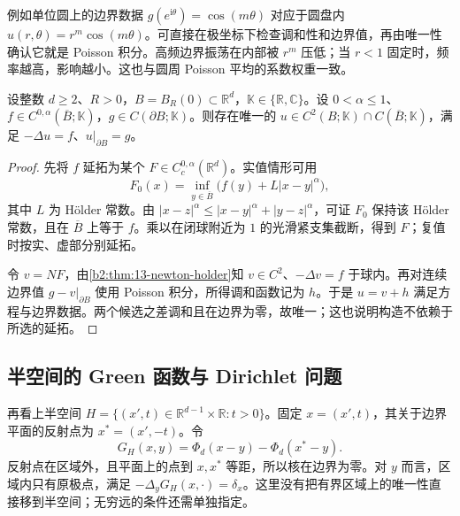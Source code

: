 例如单位圆上的边界数据 \(g(e^{\mathrm{i}\theta})=\cos(m\theta)\) 对应于圆盘内 \(u(r,\theta)=r^m\cos(m\theta)\)。可直接在极坐标下检查调和性和边界值，再由唯一性确认它就是 Poisson 积分。高频边界振荡在内部被 \(r^m\) 压低；当 \(r<1\) 固定时，频率越高，影响越小。这也与圆周 Poisson 平均的系数权重一致。

\begin{corollary}\label{b2:cor:13-ball-poisson-problem}
设整数 \(d\geq2\)、\(R>0\)，\(B=B_R(0)\subset\mathbb R^d\)，\(\mathbb K\in\{\mathbb R,\mathbb C\}\)。设 \(0<\alpha\leq1\)、\(f\in C^{0,\alpha}(\overline B;\mathbb K)\)，\(g\in C(\partial B;\mathbb K)\)。则存在唯一的 \(u\in C^2(B;\mathbb K)\cap C(\overline B;\mathbb K)\)，满足 \(-\Delta u=f\)、\(u|_{\partial B}=g\)。
\end{corollary}
\begin{proof}
先将 \(f\) 延拓为某个 \(F\in C_c^{0,\alpha}(\mathbb R^d)\)。实值情形可用
\[
 F_0(x)=\inf_{y\in\overline B}\bigl(f(y)+L|x-y|^\alpha\bigr),
\]
其中 \(L\) 为 Hölder 常数。由 \(|x-z|^\alpha\leq|x-y|^\alpha+|y-z|^\alpha\)，可证 \(F_0\) 保持该 Hölder 常数，且在 \(\overline B\) 上等于 \(f\)。乘以在闭球附近为 \(1\) 的光滑紧支集截断，得到 \(F\)；复值时按实、虚部分别延拓。

令 \(v=NF\)，由\cref{b2:thm:13-newton-holder}知 \(v\in C^2\)、\(-\Delta v=f\) 于球内。再对连续边界值 \(g-v|_{\partial B}\) 使用 Poisson 积分，所得调和函数记为 \(h\)。于是 \(u=v+h\) 满足方程与边界数据。两个候选之差调和且在边界为零，故唯一；这也说明构造不依赖于所选的延拓。
\end{proof}


\subsection{半空间的 Green 函数与 Dirichlet 问题}
\label{b2:subsec:13-halfspace-boundary}

再看上半空间 \(H=\{(x',t)\in\mathbb R^{d-1}\times\mathbb R:t>0\}\)。固定 \(x=(x',t)\)，其关于边界平面的反射点为 \(x^*=(x',-t)\)。令
\[
 G_H(x,y)=\Phi_d(x-y)-\Phi_d(x^*-y).
\]
反射点在区域外，且平面上的点到 \(x,x^*\) 等距，所以核在边界为零。对 \(y\) 而言，区域内只有原极点，满足 \(-\Delta_yG_H(x,\cdot)=\delta_x\)。这里没有把有界区域上的唯一性直接移到半空间；无穷远的条件还需单独指定。

